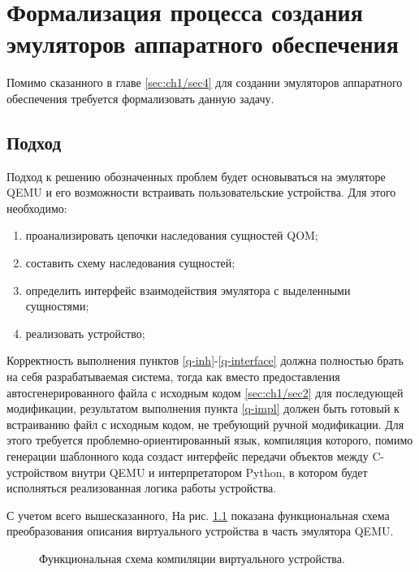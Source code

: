 \chapter{Формализация процесса создания эмуляторов аппаратного обеспечения}\label{ch:ch2}

Помимо сказанного в главе \ref{sec:ch1/sec4} для создании эмуляторов аппаратного обеспечения
требуется формализовать данную задачу.

\section{Подход}\label{sec:ch2/sec1}

Подход к решению обозначенных проблем будет основываться на эмуляторе QEMU и его
возможности встраивать пользовательские устройства.
Для этого необходимо:

\begin{enumerate}[label={\arabic*)}]
    \item \label{q-inh} проанализировать цепочки наследования сущностей QOM;
    \item \label{q-inh-scheme} составить схему наследования сущностей;
    \item \label{q-interface} определить интерфейс взаимодействия эмулятора с выделенными сущностями;
    \item \label{q-impl} реализовать устройство;
\end{enumerate}

Корректность выполнения пунктов \ref{q-inh}-\ref{q-interface} должна полностью брать на себя разрабатываемая система,
тогда как вместо предоставления автосгенерированного файла с исходным кодом \ref{sec:ch1/sec2} для
последующей модификации, результатом выполнения пункта \ref{q-impl} должен быть готовый к встраиванию
файл с исходным кодом, не требующий ручной модификации.
Для этого требуется проблемно-ориентированный язык, компиляция которого, помимо генерации шаблонного кода
создаст интерфейс передачи объектов между C-устройством внутри QEMU и интерпретатором Python, в
котором будет исполняться реализованная логика работы устройства.

С учетом всего вышесказанного, На рис. \ref{fig:device-compilation} показана функциональная схема преобразования
описания виртуального устройства в часть эмулятора QEMU.

\begin{figure}[!htbp]
    \centering
    
    \caption{Функциональная схема компиляции виртуального устройства.}\label{fig:device-compilation}
\end{figure}


